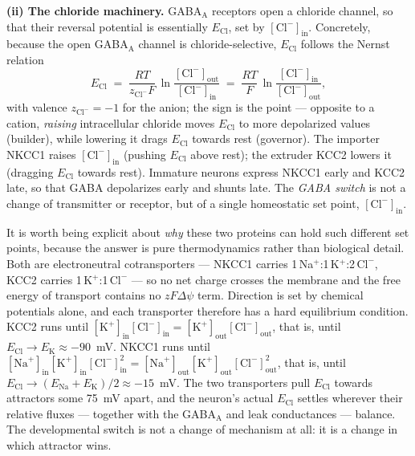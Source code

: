 \documentclass[11pt,a4paper]{article}
\newcommand{\Clm}{\mathrm{Cl}^{-}}
\newcommand{\ECl}{E_{\mathrm{Cl}}}
\begin{document}
\textbf{(ii) The chloride machinery.} GABA$_{\mathrm{A}}$ receptors open a chloride channel, so that their reversal potential is essentially $\ECl$, set by $[\Clm]_{\mathrm{in}}$. Concretely, because the open GABA$_{\mathrm{A}}$ channel is chloride-selective, $\ECl$ follows the Nernst relation
\begin{equation}
\ECl \;=\; \frac{RT}{z_{\Clm}F}\,\ln\frac{[\Clm]_{\mathrm{out}}}{[\Clm]_{\mathrm{in}}}
     \;=\; \frac{RT}{F}\,\ln\frac{[\Clm]_{\mathrm{in}}}{[\Clm]_{\mathrm{out}}},
\end{equation}
with valence $z_{\Clm}=-1$ for the anion; the sign is the point --- opposite to a cation, \emph{raising} intracellular chloride moves $\ECl$ to more depolarized values (builder), while lowering it drags $\ECl$ towards rest (governor). The importer NKCC1 raises $[\Clm]_{\mathrm{in}}$ (pushing $\ECl$ above rest); the extruder KCC2 lowers it (dragging $\ECl$ towards rest). Immature neurons express NKCC1 early and KCC2 late, so that GABA depolarizes early and shunts late. The \emph{GABA switch} is not a change of transmitter or receptor, but of a single homeostatic set point, $[\Clm]_{\mathrm{in}}$.

It is worth being explicit about \emph{why} these two proteins can hold such different set points, because the answer is pure thermodynamics rather than biological detail. Both are electroneutral cotransporters --- NKCC1 carries 1\,Na$^{+}$:1\,K$^{+}$:2\,$\Clm$, KCC2 carries 1\,K$^{+}$:1\,$\Clm$ --- so no net charge crosses the membrane and the free energy of transport contains no $zF\Delta\psi$ term. Direction is set by chemical potentials alone, and each transporter therefore has a hard equilibrium condition. KCC2 runs until $[\mathrm{K}^{+}]_{\mathrm{in}}[\Clm]_{\mathrm{in}}=[\mathrm{K}^{+}]_{\mathrm{out}}[\Clm]_{\mathrm{out}}$, that is, until $\ECl\rightarrow E_{\mathrm{K}}\approx-90$~mV. NKCC1 runs until $[\mathrm{Na}^{+}]_{\mathrm{in}}[\mathrm{K}^{+}]_{\mathrm{in}}[\Clm]_{\mathrm{in}}^{2}=[\mathrm{Na}^{+}]_{\mathrm{out}}[\mathrm{K}^{+}]_{\mathrm{out}}[\Clm]_{\mathrm{out}}^{2}$, that is, until $\ECl\rightarrow(E_{\mathrm{Na}}+E_{\mathrm{K}})/2\approx-15$~mV. The two transporters pull $\ECl$ towards attractors some 75~mV apart, and the neuron's actual $\ECl$ settles wherever their relative fluxes --- together with the GABA$_{\mathrm{A}}$ and leak conductances --- balance. The developmental switch is not a change of mechanism at all: it is a change in which attractor wins.
\end{document}
